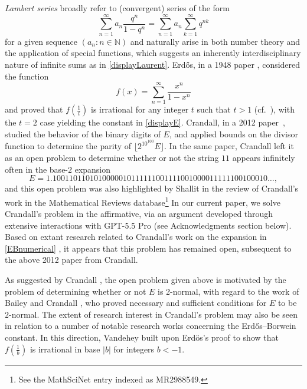 \documentclass[12pt]{article}
\begin{document}
 \emph{Lambert series} broadly refer to (convergent) series of the form 
\begin{equation}\label{displayLaurent}
 \sum_{n=1}^{\infty} a_n \frac{q^n}{1-q^n} = \sum_{n=1}^{\infty} a_{n} \sum_{k=1}^{\infty} q^{n k} 
\end{equation}
 for a given sequence $(a_n : n \in \mathbb{N})$ and naturally arise in both number theory and the application of special functions, which 
 suggests an inherently interdisciplinary nature of infinite sums as in \eqref{displayLaurent}. Erd\H{o}s, in a 1948 paper 
 \cite{Erdos1948}, considered the function 
\begin{equation}\label{Erdosf}
 f(x) = \sum_{n=1}^{\infty} \frac{x^n}{1-x^n}
\end{equation}
 and proved that $f\left( \frac{1}{t} \right)$ is irrational for any integer $t$ such that $t > 1$ (cf.\ \cite{Vandehey2013}), with the $t = 2$ 
 case yielding the constant in \eqref{displayE}. Crandall, in a 2012 paper~\cite{Crandall2012}, studied the behavior of the binary digits of
 $E$, and applied bounds on the divisor function to determine the parity of
 $ \big\lfloor 2^{{10}^{100}} E \big\rfloor$. 
 In the same paper, 
 Crandall left it as an open problem to determine whether or not 
 the string $11$ appears infinitely often in the base-$2$ expansion 
\begin{equation}\label{EBnumerical}
 E = 1.1001101101010000010111111001111001000011111100100010\ldots, 
\end{equation}
 and this open problem was also highlighted by Shallit in the review of Crandall's work in the Mathematical Reviews database\footnote{See 
 the MathSciNet entry indexed as MR2988549.} In our current paper, we solve Crandall's problem in the affirmative, 
 via an argument developed through extensive interactions with GPT-5.5 Pro (see Acknowledgments section below). 
 Based on extant 
 research related to Crandall's work on the expansion in 
 \eqref{EBnumerical} \cite{AragonArtachoBaileyBorweinBorwein2013,Murakami2025,MurakamiTachiya2025}, 
 it appears that this problem has remained open, subsequent to the above 2012 paper from Crandall. 

 As suggested by Crandall \cite{Crandall2012}, the open problem given above is motivated by the problem of determining whether or 
 not $E$ is 2-normal, with regard to the work of Bailey and Crandall \cite{BaileyCrandall2002}, who proved necessary and sufficient 
 conditions for $E$ to be $2$-normal. The extent of research interest in Crandall's problem may also be seen in relation to a number of 
 notable research works concerning the Erd\H{o}s--Borwein constant. In this direction, Vandehey \cite{Vandehey2013} built upon 
 Erd\"os's proof \cite{Erdos1948} to show that $f\left( \frac{1}{b} \right)$ is irrational in base $|b|$ for integers $b < -1$. 
\end{document}
